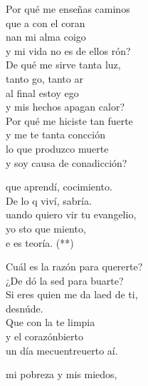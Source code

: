 \begin{cancion}%
	Por qué me enseñas caminos \\
	que a con el coran \\
	nan mi alma coigo\\
	y mi vida no es de ellos rón?\\
	De qué me sirve tanta luz, \\
	tanto go, tanto ar\\
	al final estoy ego \\
	y mis hechos apagan  calor?\\
	Por qué me hiciste tan fuerte \\
	y me te tanta concción\\
	lo que produzco  muerte \\
	y soy causa de conadicción?\jump\\
	\begin{chorus}%
		que aprendí, cocimiento. \\
		De lo q viví, sabría.\\
		uando quiero vir tu evangelio, \\
		yo sto que miento,\\
		e es teoría. (**)\jump\\
	\end{chorus}%
	Cuál es la razón para quererte?\\
	¿De dó la sed para buarte? \\
	Si eres  quien me da laed de ti, \\
	desnúde.\\
	Que con la te limpia \\
	y el corazónbierto\\
	un día mecuentreuerto aí.\jump\\
	\begin{chorus}%
		mi pobreza y  mis miedos, \\

\end{chorus}
\end{cancion}
